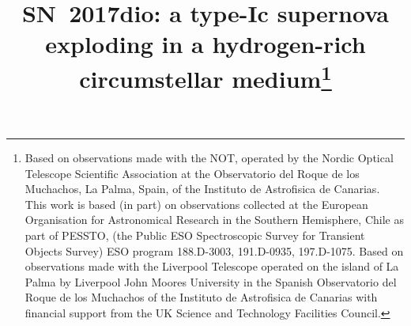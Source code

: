\documentclass[twocolumn]{aastex61}
\begin{document}
\title{SN~2017dio: a type-Ic supernova exploding in a hydrogen-rich circumstellar medium\footnote{Based on observations made with the NOT, operated by the Nordic Optical Telescope Scientific Association at the Observatorio del Roque de los Muchachos, La Palma, Spain, of the Instituto de Astrofisica de Canarias.
This work is based (in part) on observations collected at the European Organisation for Astronomical Research in the Southern Hemisphere, Chile as part of PESSTO, (the Public ESO Spectroscopic Survey for Transient Objects Survey) ESO program 188.D-3003, 191.D-0935, 197.D-1075.
Based on observations made with the Liverpool Telescope operated on the island of La Palma by Liverpool John Moores University in the Spanish Observatorio del Roque de los Muchachos of the Instituto de Astrofisica de Canarias with financial support from the UK Science and Technology Facilities Council. }}

\end{document}
